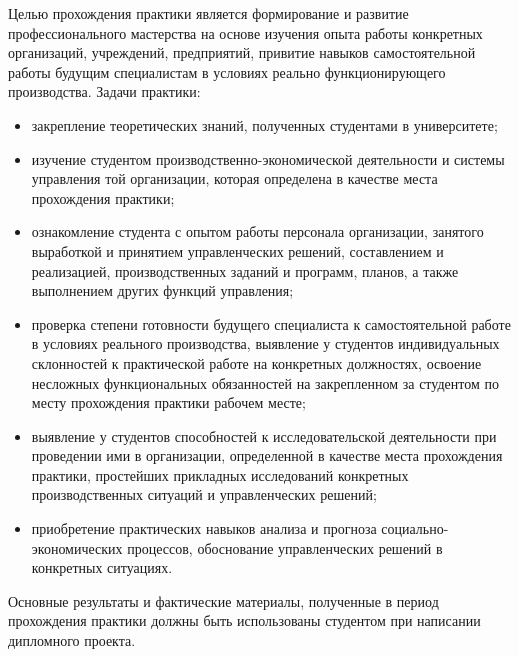 \setcounter{page}{3}

Целью прохождения практики является формирование и развитие профессионального мастерства на основе изучения опыта работы конкретных организаций, учреждений, предприятий, привитие навыков самостоятельной работы будущим специалистам в условиях реально функционирующего производства.
Задачи практики:

\begin{itemize}
\item закрепление теоретических знаний, полученных студентами в университете;
\item изучение студентом производственно-экономической деятельности и системы управления той организации, которая определена в качестве места прохождения практики;
\item ознакомление студента с опытом работы персонала организации, занятого выработкой и принятием управленческих решений, составлением и реализацией, производственных заданий и программ, планов, а также выполнением других функций управления;
\item проверка степени готовности будущего специалиста к самостоятельной работе в условиях реального производства, выявление у студентов индивидуальных склонностей к практической работе на конкретных должностях, освоение несложных функциональных обязанностей на закрепленном за студентом по месту прохождения практики рабочем месте;
\item выявление у студентов способностей к исследовательской деятельности при проведении ими в организации, определенной в качестве места прохождения практики, простейших прикладных исследований конкретных производственных ситуаций и управленческих решений;
\item приобретение практических навыков анализа и прогноза социально-экономических процессов, обоснование управленческих решений в конкретных ситуациях.
\end{itemize}

Основные результаты и фактические материалы, полученные в период прохождения практики должны быть использованы студентом при написании дипломного проекта.